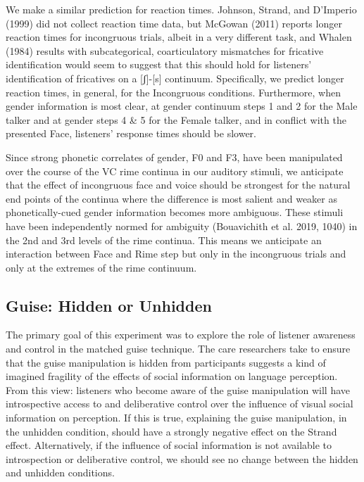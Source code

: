 \documentclass[
  letterpaper,
  DIV=11,
  numbers=noendperiod]{scrartcl}
\begin{document}
We make a similar prediction for reaction times. Johnson, Strand, and
D'Imperio (1999) did not collect reaction time data, but McGowan (2011)
reports longer reaction times for incongruous trials, albeit in a very
different task, and Whalen (1984) results with subcategorical,
coarticulatory mismatches for fricative identification would seem to
suggest that this should hold for listeners' identification of
fricatives on a {[}ʃ{]}-{[}s{]} continuum. Specifically, we predict
longer reaction times, in general, for the Incongruous conditions.
Furthermore, when gender information is most clear, at gender continuum
steps 1 and 2 for the Male talker and at gender steps 4 \& 5 for the
Female talker, and in conflict with the presented Face, listeners'
response times should be slower.

Since strong phonetic correlates of gender, F0 and F3, have been
manipulated over the course of the VC rime continua in our auditory
stimuli, we anticipate that the effect of incongruous face and voice
should be strongest for the natural end points of the continua where the
difference is most salient and weaker as phonetically-cued gender
information becomes more ambiguous. These stimuli have been
independently normed for ambiguity (Bouavichith et al. 2019, 1040) in
the 2nd and 3rd levels of the rime continua. This means we anticipate an
interaction between Face and Rime step but only in the incongruous
trials and only at the extremes of the rime continuum.

\subsection{Guise: Hidden or Unhidden}\label{sec-pred-guise}

The primary goal of this experiment was to explore the role of listener
awareness and control in the matched guise technique. The care
researchers take to ensure that the guise manipulation is hidden from
participants suggests a kind of imagined fragility of the effects of
social information on language perception. From this view: listeners who
become aware of the guise manipulation will have introspective access to
and deliberative control over the influence of visual social information
on perception. If this is true, explaining the guise manipulation, in
the unhidden condition, should have a strongly negative effect on the
Strand effect. Alternatively, if the influence of social information is
not available to introspection or deliberative control, we should see no
change between the hidden and unhidden conditions.
\end{document}
